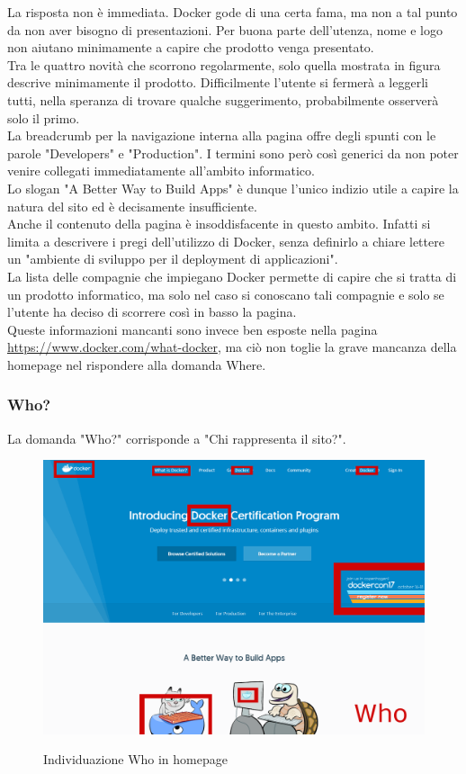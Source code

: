 \documentclass[a4paper]{article}
\begin{document}
\noindent La risposta non è immediata. Docker gode di una certa fama, ma non a tal punto da non aver bisogno di presentazioni. Per buona parte dell'utenza, nome e logo non aiutano minimamente a capire che prodotto venga presentato.
\\
Tra le quattro novità che scorrono regolarmente, solo quella mostrata in figura descrive minimamente il prodotto. Difficilmente l'utente si fermerà a leggerli tutti, nella speranza di trovare qualche suggerimento, probabilmente osserverà solo il primo.
\\
La breadcrumb per la navigazione interna alla pagina offre degli spunti con le parole "Developers" e "Production". I termini sono però così generici da non poter venire collegati immediatamente all'ambito informatico.
\\
Lo slogan "A Better Way to Build Apps" è dunque l'unico indizio utile a capire la natura del sito ed è decisamente insufficiente.
\\
Anche il contenuto della pagina è insoddisfacente in questo ambito. Infatti si limita a descrivere i pregi dell'utilizzo di Docker, senza definirlo a chiare lettere un "ambiente di sviluppo per il deployment di applicazioni".
\\
La lista delle compagnie che impiegano Docker permette di capire che si tratta di un prodotto informatico, ma solo nel caso si conoscano tali compagnie e solo se l'utente ha deciso di scorrere così in basso la pagina.
\\
Queste informazioni mancanti sono invece ben esposte nella pagina \url{https://www.docker.com/what-docker}, ma ciò non toglie la grave mancanza della homepage nel rispondere alla domanda Where. 

\subsubsection{Who?}
La domanda "Who?" corrisponde a "Chi rappresenta il sito?".

\begin{figure}[H]
	\centering
	\includegraphics[width=\linewidth]{images/who.png}
    \label{fig:homepagewho}
    \caption{Individuazione Who in homepage}
\end{figure}
\end{document}

